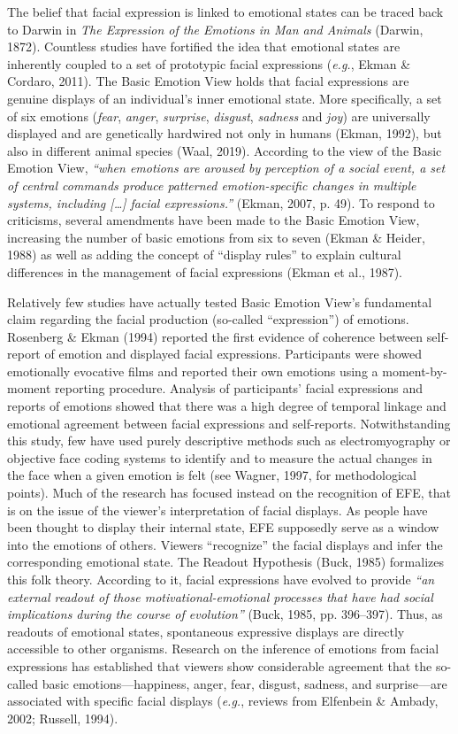 \documentclass[man]{apa6}
\begin{document}
The belief that facial expression is linked to emotional states can be traced back to Darwin in \emph{The Expression of the Emotions in Man and Animals} (Darwin, 1872). Countless studies have fortified the idea that emotional states are inherently coupled to a set of prototypic facial expressions (\emph{e.g.}, Ekman \& Cordaro, 2011). The Basic Emotion View holds that facial expressions are genuine displays of an individual's inner emotional state. More specifically, a set of six emotions (\emph{fear}, \emph{anger}, \emph{surprise}, \emph{disgust}, \emph{sadness} and \emph{joy}) are universally displayed and are genetically hardwired not only in humans (Ekman, 1992), but also in different animal species (Waal, 2019). According to the view of the Basic Emotion View, \emph{\enquote{when emotions are aroused by perception of a social event, a set of central commands produce patterned emotion-specific changes in multiple systems, including {[}\ldots{}{]} facial expressions.}} (Ekman, 2007, p. 49). To respond to criticisms, several amendments have been made to the Basic Emotion View, increasing the number of basic emotions from six to seven (Ekman \& Heider, 1988) as well as adding the concept of \enquote{display rules} to explain cultural differences in the management of facial expressions (Ekman et al., 1987).

Relatively few studies have actually tested Basic Emotion View's fundamental claim regarding the facial production (so-called \enquote{expression}) of emotions. Rosenberg \& Ekman (1994) reported the first evidence of coherence between self-report of emotion and displayed facial expressions. Participants were showed emotionally evocative films and reported their own emotions using a moment-by-moment reporting procedure. Analysis of participants' facial expressions and reports of emotions showed that there was a high degree of temporal linkage and emotional agreement between facial expressions and self-reports. Notwithstanding this study, few have used purely descriptive methods such as electromyography or objective face coding systems to identify and to measure the actual changes in the face when a given emotion is felt (see Wagner, 1997, for methodological points). Much of the research has focused instead on the recognition of EFE, that is on the issue of the viewer's interpretation of facial displays. As people have been thought to display their internal state, EFE supposedly serve as a window into the emotions of others. Viewers \enquote{recognize} the facial displays and infer the corresponding emotional state. The Readout Hypothesis (Buck, 1985) formalizes this folk theory. According to it, facial expressions have evolved to provide \emph{\enquote{an external readout of those motivational-emotional processes that have had social implications during the course of evolution}} (Buck, 1985, pp. 396--397). Thus, as readouts of emotional states, spontaneous expressive displays are directly accessible to other organisms. Research on the inference of emotions from facial expressions has established that viewers show considerable agreement that the so-called basic emotions---happiness, anger, fear, disgust, sadness, and surprise---are associated with specific facial displays (\emph{e.g.}, reviews from Elfenbein \& Ambady, 2002; Russell, 1994).
\end{document}
